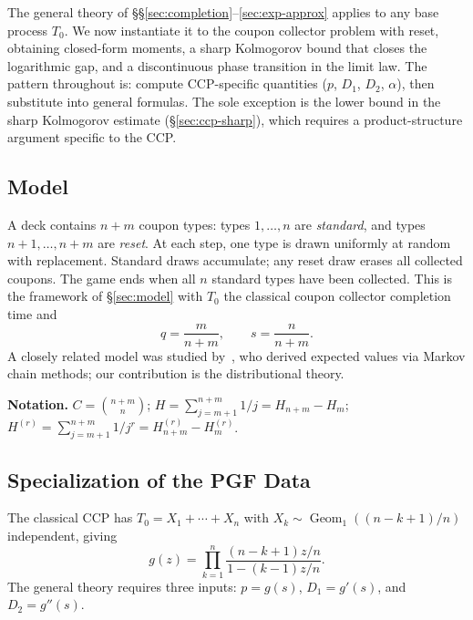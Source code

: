 \documentclass[11pt]{article}
\theoremstyle{plain}
\theoremstyle{definition}
\theoremstyle{remark}
\DeclareMathOperator{\Geom}{Geom}
\begin{document}
The general theory of \S\S\ref{sec:completion}--\ref{sec:exp-approx} applies to any base process $T_0$.  We now instantiate it to the coupon collector problem with reset, obtaining closed-form moments, a sharp Kolmogorov bound that closes the logarithmic gap, and a discontinuous phase transition in the limit law.  The pattern throughout is: compute CCP-specific quantities ($p$, $D_1$, $D_2$, $\alpha$), then substitute into general formulas.  The sole exception is the lower bound in the sharp Kolmogorov estimate (\S\ref{sec:ccp-sharp}), which requires a product-structure argument specific to the CCP.


\subsection{Model}\label{sec:ccp-model}

A deck contains $n + m$ coupon types: types $1, \ldots, n$ are \emph{standard}, and types $n+1, \ldots, n+m$ are \emph{reset}.  At each step, one type is drawn uniformly at random with replacement.  Standard draws accumulate; any reset draw erases all collected coupons.  The game ends when all $n$ standard types have been collected.  This is the framework of \S\ref{sec:model} with $T_0$ the classical coupon collector completion time and
\[
  q = \frac{m}{n+m}, \qquad s = \frac{n}{n+m}.
\]
A closely related model was studied by~\cite{JT24}, who derived expected values via Markov chain methods; our contribution is the distributional theory.

\textbf{Notation.}\; $C = \binom{n+m}{n}$;\; $H = \sum_{j=m+1}^{n+m} 1/j = H_{n+m} - H_m$;\; $H^{(r)} = \sum_{j=m+1}^{n+m} 1/j^r = H^{(r)}_{n+m} - H^{(r)}_m$.


\subsection{Specialization of the PGF Data}\label{sec:ccp-pgf}

The classical CCP has $T_0 = X_1 + \cdots + X_n$ with $X_k \sim \Geom_1((n{-}k{+}1)/n)$ independent, giving
\begin{equation}\label{eq:ccp-pgf}
  g(z) = \prod_{k=1}^{n} \frac{(n{-}k{+}1)z/n}{1 - (k{-}1)z/n}.
\end{equation}
The general theory requires three inputs: $p = g(s)$, $D_1 = g'(s)$, and $D_2 = g''(s)$.
\end{document}
